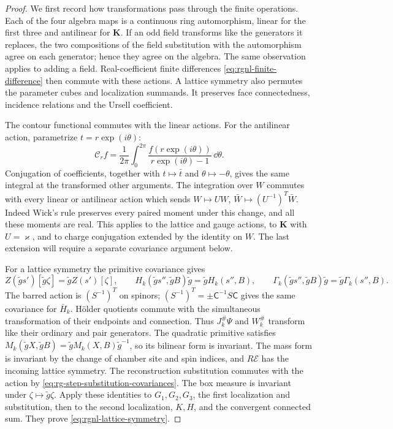 \begin{proof}
We first record how transformations pass through the
finite operations. Each of the four algebra maps is a
continuous ring automorphism, linear for the first three
and antilinear for $\mathbf K$. If an odd field transforms
like the generators it replaces, the two compositions of
the field substitution with the automorphism agree on
each generator; hence they agree on the algebra.
The same observation applies to adding a field.
Real-coefficient finite differences
\eqref{eq:rgnl-finite-difference} then commute with these
actions. A lattice symmetry also permutes the parameter
cubes and localization summands. It preserves face
connectedness, incidence relations and the Ursell coefficient.

The contour functional commutes with the linear actions.
For the antilinear action, parametrize $t=r\exp(i\theta)$:
\[
 \mathcal C_rf=\frac1{2\pi}\int_0^{2\pi}
             \frac{f(r\exp(i\theta))}{r\exp(i\theta)-1}\,\dd\theta.
\]
Conjugation of coefficients, together with
$t\mapsto\bar t$ and $\theta\mapsto-\theta$, gives the
same integral at the transformed other arguments.
The integration over $W$ commutes with every linear or
antilinear action which sends
$W\mapsto UW$, $\bar W\mapsto(U^{-1})^T\bar W$.
Indeed Wick's rule preserves every paired moment under
this change, and all these moments are real.
This applies to the lattice and gauge actions, to
$\mathbf K$ with $U=\varkappa$, and to charge conjugation
extended by the identity on $W$.
The last extension will require a separate covariance
argument below.

For a lattice symmetry the primitive covariance gives
\[
 Z(\tilde gs')[\tilde g\zeta]=\tilde gZ(s')[\zeta],\qquad
 H_k(\tilde gs'',\tilde gB)\tilde g=\tilde gH_k(s'',B),
 \qquad
 \Gamma_k(\tilde gs'',\tilde gB)\tilde g=\tilde g\Gamma_k(s'',B).
\]
The barred action is $(S^{-1})^T$ on spinors;
$(S^{-1})^T=\pm\mathsf C^{-1}S\mathsf C$ gives the
same covariance for $\bar H_k$.
H\"older quotients commute with the simultaneous
transformation of their endpoints and connection.
Thus $J_k^\#\Psi$ and $W_k^\#$ transform like their
ordinary and pair generators.
The quadratic primitive satisfies
$M_k(\tilde gX,\tilde gB)=\tilde gM_k(X,B)\tilde g^{-1}$,
so its bilinear form is invariant.
The mass form is invariant by the change of chamber
site and spin indices, and $R\mathscr E$ has the
incoming lattice symmetry. The reconstruction substitution
commutes with the action by
\eqref{eq:rg-step-substitution-covariances}.
The box measure is invariant under $\zeta\mapsto\tilde g\zeta$.
Apply these identities to $G_1,G_2,G_3$, the first
localization and substitution, then to the second
localization, $K,H$, and the convergent connected sum.
They prove \eqref{eq:rgnl-lattice-symmetry}.


\end{proof}
